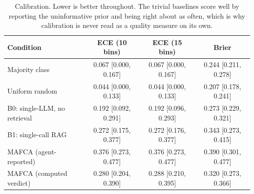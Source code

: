 \begin{table}[t]
\centering
\caption{Calibration. Lower is better throughout. The trivial baselines score well by reporting the uninformative prior and being right about as often, which is why calibration is never read as a quality measure on its own.}
\label{tab:cond:calib}
\small
\begin{tabular}{@{}lccc@{}}
\toprule
Condition & ECE (10 bins) & ECE (15 bins) & Brier \\
\midrule
Majority class & 0.067 [0.000, 0.167] & 0.067 [0.000, 0.167] & 0.244 [0.211, 0.278] \\
Uniform random & 0.044 [0.000, 0.133] & 0.044 [0.000, 0.133] & 0.207 [0.178, 0.241] \\
B0: single-LLM, no retrieval & 0.192 [0.092, 0.291] & 0.192 [0.096, 0.293] & 0.273 [0.229, 0.321] \\
B1: single-call RAG & 0.272 [0.175, 0.377] & 0.272 [0.176, 0.377] & 0.343 [0.273, 0.415] \\
MAFCA (agent-reported) & 0.376 [0.273, 0.477] & 0.376 [0.273, 0.477] & 0.390 [0.301, 0.477] \\
MAFCA (computed verdict) & 0.280 [0.204, 0.390] & 0.288 [0.210, 0.395] & 0.320 [0.273, 0.366] \\
\bottomrule
\end{tabular}
\end{table}
